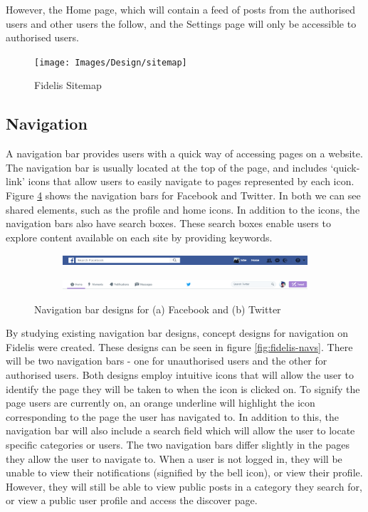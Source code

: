 However, the Home page, which will contain a feed of posts from the authorised users and other users the follow, and the Settings page will only be accessible to authorised users.

\begin{figure}[H]
\centering
\texttt{[image: Images/Design/sitemap]}
\caption{Fidelis Sitemap}
\label{fig:sitemap}
\end{figure}

\subsection{Navigation}
A navigation bar provides users with a quick way of accessing pages on a website. The navigation bar is usually located at the top of the page, and includes `quick-link' icons that allow users to easily navigate to pages represented by each icon. Figure \ref{fig:navs} shows the navigation bars for Facebook and Twitter. In both we can see shared elements, such as the profile and home icons. In addition to the icons, the navigation bars also have search boxes. These search boxes enable users to explore content available on each site by providing keywords.

\begin{figure}[H]
\centering
\begin{subfigure}{1\linewidth}
	\includegraphics[width=1\linewidth]{Images/Design/fb-nav}
	\caption{}
	\label{fig:fb-nav}
\end{subfigure}
\begin{subfigure}{1\linewidth}
	\includegraphics[width=1\linewidth]{Images/Design/twitter-nav}
	\caption{}
	\label{fig:twitter-nav}
\end{subfigure}
\caption{Navigation bar designs for (a) Facebook and (b) Twitter}
\label{fig:navs}
\end{figure}

By studying existing navigation bar designs, concept designs for navigation on Fidelis were created. These designs can be seen in figure \ref{fig:fidelis-navs}. There will be two navigation bars - one for unauthorised users and the other for authorised users. Both designs employ intuitive icons that will allow the user to identify the page they will be taken to when the icon is clicked on. To signify the page users are currently on, an orange underline will highlight the icon corresponding to the page the user has navigated to. In addition to this, the navigation bar will also include a search field which will allow the user to locate specific categories or users. The two navigation bars differ slightly in the pages they allow the user to navigate to. When a user is not logged in, they will be unable to view their notifications (signified by the bell icon), or view their profile. However, they will still be able to view public posts in a category they search for, or view a public user profile and access the discover page.

